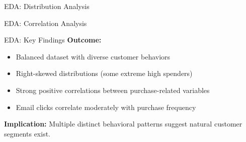 \documentclass[aspectratio=169,ignorenonframetext]{beamer}
\begin{document}
\begin{frame}[fragile]{EDA: Distribution Analysis}
\begin{Shaded}
\begin{Highlighting}[]
\OperatorTok{=}\NormalTok{)}


\OperatorTok{=}\NormalTok{, }\OperatorTok{=}\NormalTok{(}\NormalTok{, }\NormalTok{))}
 
\OperatorTok{=}\NormalTok{)}
\end{Highlighting}
\end{Shaded}
\end{frame}

\begin{frame}[fragile]{EDA: Correlation Analysis}
\begin{Shaded}
\begin{Highlighting}[]
\OperatorTok{=}
\OperatorTok{=}\NormalTok{,}
\OperatorTok{=}\OperatorTok{=}\NormalTok{)}

\end{Highlighting}
\end{Shaded}
\end{frame}

\begin{frame}{EDA: Key Findings}
\textbf{Outcome:}

\begin{itemize}
\item
  Balanced dataset with diverse customer behaviors
\item
  Right-skewed distributions (some extreme high spenders)
\item
  Strong positive correlations between purchase-related variables
\item
  Email clicks correlate moderately with purchase frequency
\end{itemize}

\textbf{Implication:} Multiple distinct behavioral patterns suggest
natural customer segments exist.
\end{frame}
\end{document}
